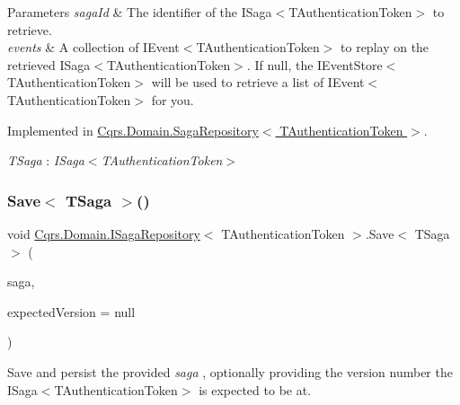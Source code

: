 \begin{DoxyParams}{Parameters}
{\em saga\+Id} & The identifier of the I\+Saga$<$\+T\+Authentication\+Token$>$ to retrieve.\\
\hline
{\em events} & A collection of I\+Event$<$\+T\+Authentication\+Token$>$ to replay on the retrieved I\+Saga$<$\+T\+Authentication\+Token$>$. If null, the I\+Event\+Store$<$\+T\+Authentication\+Token$>$ will be used to retrieve a list of I\+Event$<$\+T\+Authentication\+Token$>$ for you. \\
\hline
\end{DoxyParams}


Implemented in \hyperlink{classCqrs_1_1Domain_1_1SagaRepository_a1b80ecc2a5719d1681ca5d182a252120_a1b80ecc2a5719d1681ca5d182a252120}{Cqrs.\+Domain.\+Saga\+Repository$<$ T\+Authentication\+Token $>$}.

\begin{Desc}
\item[Type Constraints]\begin{description}
\item[{\em T\+Saga} : {\em I\+Saga$<$T\+Authentication\+Token$>$}]\end{description}
\end{Desc}
\mbox{\label{interfaceCqrs_1_1Domain_1_1ISagaRepository_ad539cdc70f3168d0335c9510742e25cd_ad539cdc70f3168d0335c9510742e25cd}} 
\subsubsection{\texorpdfstring{Save$<$ T\+Saga $>$()}{Save< TSaga >()}}
{\footnotesize\ttfamily void \hyperlink{interfaceCqrs_1_1Domain_1_1ISagaRepository}{Cqrs.\+Domain.\+I\+Saga\+Repository}$<$ T\+Authentication\+Token $>$.Save$<$ T\+Saga $>$ (\begin{DoxyParamCaption}\item[{T\+Saga}]{saga,  }\item[{int?}]{expected\+Version = {\ttfamily null} }\end{DoxyParamCaption})}



Save and persist the provided {\itshape saga} , optionally providing the version number the I\+Saga$<$\+T\+Authentication\+Token$>$ is expected to be at. 


